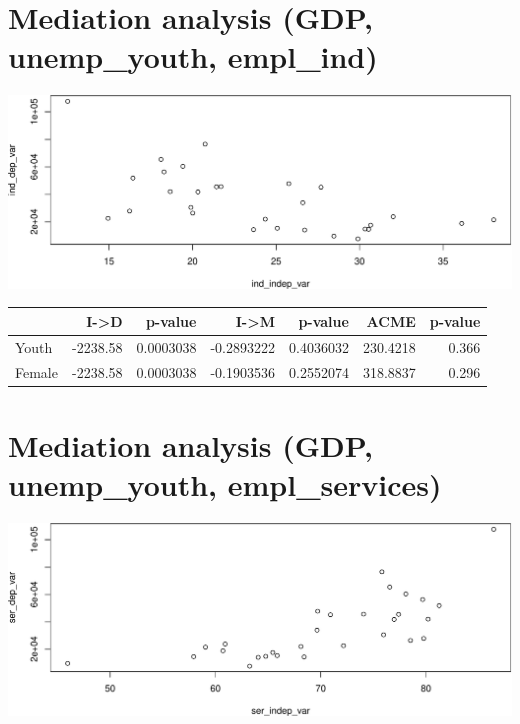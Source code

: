 \documentclass[
]{article}
\begin{document}
\hypertarget{mediation-analysis-gdp-unemp_youth-empl_ind}{%
\section{Mediation analysis (GDP, unemp\_youth,
empl\_ind)}\label{mediation-analysis-gdp-unemp_youth-empl_ind}}

\includegraphics{main_files/figure-latex/mediation_ind-1.pdf}

\begin{table}
\centering
\begin{tabular}{l|r|r|r|r|r|r}
\hline
  & I->D & p-value & I->M & p-value & ACME & p-value\\
\hline
Youth & -2238.58 & 0.0003038 & -0.2893222 & 0.4036032 & 230.4218 & 0.366\\
\hline
Female & -2238.58 & 0.0003038 & -0.1903536 & 0.2552074 & 318.8837 & 0.296\\
\hline
\end{tabular}
\end{table}

\hypertarget{mediation-analysis-gdp-unemp_youth-empl_services}{%
\section{Mediation analysis (GDP, unemp\_youth,
empl\_services)}\label{mediation-analysis-gdp-unemp_youth-empl_services}}

\includegraphics{main_files/figure-latex/mediation_ser-1.pdf}
\end{document}
